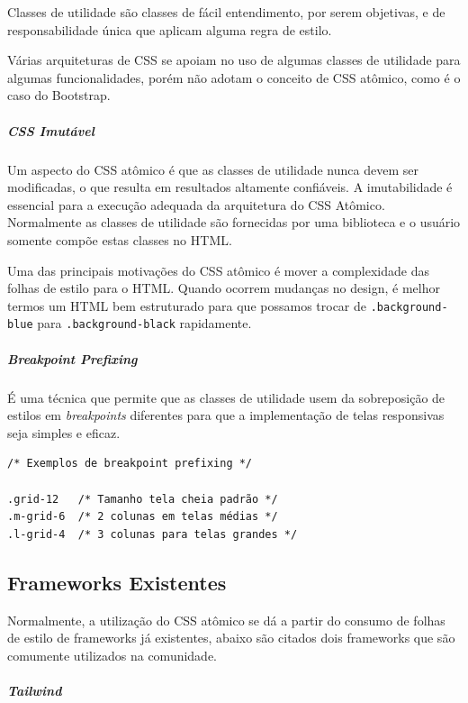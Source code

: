 Classes de utilidade são classes de fácil entendimento, por serem
objetivas, e de responsabilidade única que aplicam alguma regra de
estilo.

Várias arquiteturas de CSS se apoiam no uso de algumas classes de
utilidade para algumas funcionalidades, porém não adotam o conceito de
CSS atômico, como é o caso do Bootstrap.

\hypertarget{css-imutuxe1vel}{%
\subparagraph{CSS Imutável}\label{css-imutuxe1vel}}

Um aspecto do CSS atômico é que as classes de utilidade nunca devem ser
modificadas, o que resulta em resultados altamente confiáveis. A
imutabilidade é essencial para a execução adequada da arquitetura do CSS
Atômico. Normalmente as classes de utilidade são fornecidas por uma
biblioteca e o usuário somente compõe estas classes no HTML.

Uma das principais motivações do CSS atômico é mover a complexidade das
folhas de estilo para o HTML. Quando ocorrem mudanças no design, é
melhor termos um HTML bem estruturado para que possamos trocar de
\texttt{.background-blue} para \texttt{.background-black}
rapidamente.

\hypertarget{breakpoint-prefixing}{%
\subparagraph{Breakpoint Prefixing}\label{breakpoint-prefixing}}

É uma técnica que permite que as classes de utilidade usem da
sobreposição de estilos em \emph{breakpoints} diferentes para que a
implementação de telas responsivas seja simples e eficaz.

\begin{verbatim}
/* Exemplos de breakpoint prefixing */

.grid-12   /* Tamanho tela cheia padrão */
.m-grid-6  /* 2 colunas em telas médias */
.l-grid-4  /* 3 colunas para telas grandes */
\end{verbatim}

\hypertarget{frameworksexistentes}{%
\subsection{Frameworks Existentes}\label{frameworksexistentes}}

Normalmente, a utilização do CSS atômico se dá a partir do consumo de folhas de estilo de frameworks já existentes, abaixo são citados dois frameworks que são comumente utilizados na comunidade.

\hypertarget{tailwind}{%
\subparagraph{Tailwind}\label{tailwind}}

